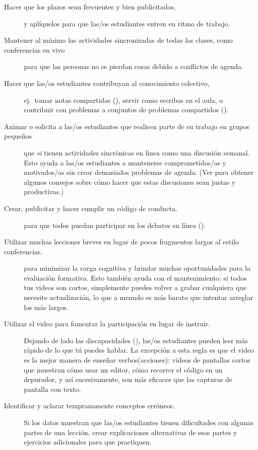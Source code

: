 \begin{description}

\item[Hacer que los plazos sean frecuentes y bien publicitados,]
  y aplíquelos para que las/os estudiantes entren en ritmo de trabajo.

\item[Mantener al mínimo las actividades sincronizadas de todas las clases, como conferencias en vivo]
  para que las personas no se pierdan cosas debido a conflictos de agenda.

\item[Hacer que las/os estudiantes contribuyan al conocimiento colectivo,]
  ej.\ tomar notas compartidas (),
  servir como escribas en el aula,
  o contribuir con problemas a conjuntos de problemas compartidos ().

\item[Animar o solicita a las/os estudiantes que realicen parte de su trabajo en grupos pequeños]
  que \emph{si} tienen actividades sincrónicas en linea
  como una discusión semanal.
  Esto ayuda a las/os estudiantes a mantenerse comprometidos/as y motivados/as sin crear demasiados problemas de agenda.
  (Ver  para obtener algunos consejos sobre cómo hacer que estas discusiones sean justas y productivas.)

\item[Crear, publicitar y hacer cumplir un código de conducta.]
  para que todos puedan participar en los debates en línea ().

\item[Utilizar muchas lecciones breves en lugar de pocos fragmentos largos al estilo conferencias.]
  para minimizar la carga cognitiva
  y brindar muchas oportunidades para la evaluación formativa.
  Esto también ayuda con el mantenimiento:
  si todos tus videos son cortos,
  simplemente puedes volver a grabar cualquiera que necesite actualización,
  lo que a menudo es más barato que intentar arreglar los más largos.

\item[Utilizar el video para fomentar la participación en lugar de instruir.]
  Dejando de lado las discapacidades (),
  las/os estudiantes pueden leer más rápido de lo que tú puedes hablar.
  La excepción a esta regla es que
  el video es la mejor manera de enseñar verbos(acciones):
  videos de pantallas cortos que muestran cómo usar un editor,
  cómo recorrer el código en un depurador,
  y así sucesivamente, son más eficaces que las capturas de pantalla con texto.

\item[Identificar y aclarar tempranamente conceptos erróneos.]
  Si los datos muestran que las/os estudiantes tienen dificultades con algunas partes de una lección,
  crear explicaciones alternativas de esos partes
  y ejercicios adicionales para que practiquen.

\end{description}

